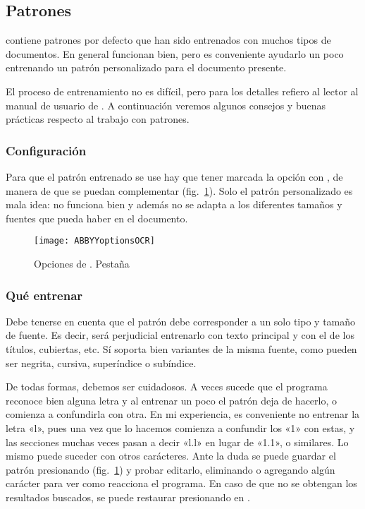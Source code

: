 \documentclass[%
	a5paper,
	10pt,
	twoside,
	openright,
	final,
]{memoir}
\begin{document}
{	\subsection{Patrones} \abbyy contiene patrones por defecto que han sido entrenados con muchos tipos de documentos. En general funcionan bien, pero es conveniente ayudarlo un poco entrenando un patrón personalizado para el documento presente.

	El proceso de entrenamiento no es difícil, pero para los detalles refiero al lector al manual de usuario de \abbyy. A continuación veremos algunos consejos y buenas prácticas respecto al trabajo con patrones.

	\subsubsection{Configuración} Para que el patrón entrenado se use hay que tener marcada la opción  con , de manera de que se puedan complementar (fig.~\ref{fig:ABBYYoptionsOCR}). Solo el patrón personalizado es mala idea: no funciona bien y además no se adapta a los diferentes tamaños y fuentes que pueda haber en el documento.

	\begin{figure}
		\centering
		\texttt{[image: ABBYYoptionsOCR]}
		\caption[Opciones de \abbyy. Pestaña \texttt{OCR}]{Opciones de \abbyy. Pestaña \label{fig:ABBYYoptionsOCR}}
	\end{figure}

	\subsubsection{Qué entrenar} Debe tenerse en cuenta que el patrón debe corresponder a un solo tipo y tamaño de fuente. Es decir, será perjudicial entrenarlo con texto principal y con el de los títulos, cubiertas, etc. Sí soporta bien variantes de la misma fuente, como pueden ser negrita, cursiva, superíndice o subíndice.

	De todas formas, debemos ser cuidadosos. A veces sucede que el programa reconoce bien alguna letra y al entrenar un poco el patrón deja de hacerlo, o comienza a confundirla con otra. En mi experiencia, es conveniente no entrenar la letra «l», pues una vez que lo hacemos comienza a confundir los «1» con estas, y las secciones muchas veces pasan a decir «l.l» en lugar de «1.1», o similares. Lo mismo puede suceder con otros carácteres. Ante la duda se puede guardar el patrón presionando  (fig.~\ref{fig:ABBYYoptionsOCR}) y probar editarlo, eliminando o agregando algún carácter para ver como reacciona el programa. En caso de que no se obtengan los resultados buscados, se puede restaurar presionando en .

}
\end{document}
